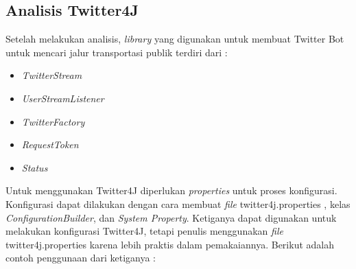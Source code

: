 \subsection{Analisis Twitter4J}
Setelah melakukan analisis, \textit{library} yang digunakan untuk membuat Twitter Bot untuk mencari jalur transportasi publik terdiri dari :
\begin{itemize}
	\item \textit{TwitterStream}
	\item \textit{UserStreamListener}
	\item \textit{TwitterFactory}
	\item \textit{RequestToken}
	\item \textit{Status}
\end{itemize}

Untuk menggunakan Twitter4J diperlukan \textit{properties} untuk proses konfigurasi. Konfigurasi dapat dilakukan dengan cara membuat \textit{file} twitter4j.properties , kelas \textit{ConfigurationBuilder}, dan \textit{System Property}. Ketiganya dapat digunakan untuk melakukan konfigurasi Twitter4J, tetapi penulis menggunakan \textit{file} twitter4j.properties karena lebih praktis dalam pemakaiannya. Berikut adalah contoh penggunaan dari ketiganya :

